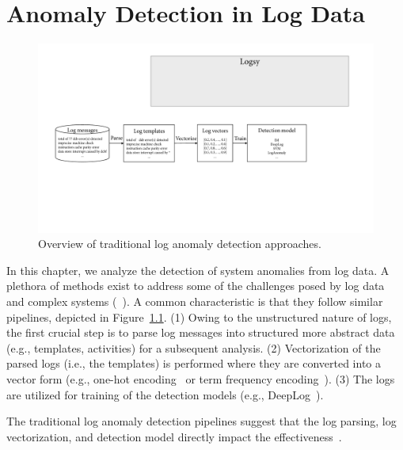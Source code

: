 \chapter{Anomaly Detection in Log Data} %
\label{ch:logs} %
\minitoc%
\bigskip

\begin{figure}[!b]
\centerline{\includegraphics[width=1.0\textwidth]{gfx/chap5/traditionaloverviewlogs.pdf}}
\caption{Overview of traditional log anomaly detection approaches.}
\label{fig:parsingreferenceanomaly}
\end{figure}

In this chapter, we analyze the detection of system anomalies from log data. A plethora of methods exist to address some of the challenges posed by log data and complex systems  (~\cite{du2017deeplog,zhang2019robust,meng2019loganomaly,shilinpca}). A common characteristic is that they follow similar pipelines, depicted in Figure~\ref{fig:parsingreferenceanomaly}. (1) Owing to the unstructured nature of logs, the first crucial step is to parse log messages into structured more abstract data (e.g., templates, activities) for a subsequent analysis. (2) Vectorization of the parsed logs (i.e., the templates) is performed where they are converted into a vector form (e.g., one-hot encoding~\cite{Goodfellow-et-al-2016} or term frequency encoding~\cite{ramos2003using}). (3) The logs are utilized for training of the detection models (e.g., DeepLog~\cite{du2017deeplog}). 

The traditional log anomaly detection pipelines suggest that the log parsing, log vectorization, and detection model directly impact the effectiveness~\cite{zhu2019tools,meng2019loganomaly}.


